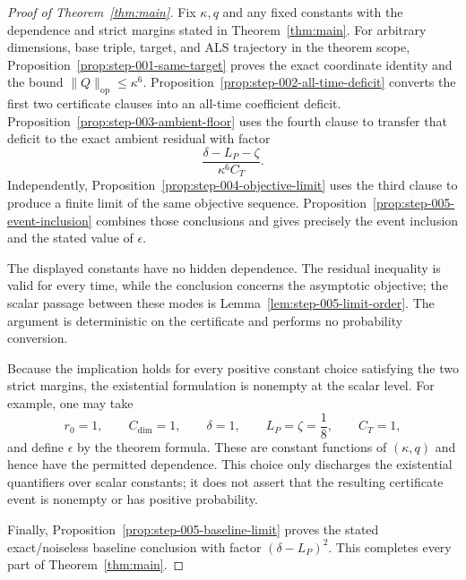 \begin{proof}[Proof of Theorem~\ref{thm:main}]
Fix $\kappa,q$ and any fixed constants with the dependence and
strict margins stated in Theorem~\ref{thm:main}.  For arbitrary dimensions,
base triple, target, and ALS trajectory in the theorem scope,
Proposition~\ref{prop:step-001-same-target} proves the exact coordinate
identity and the bound $\|Q\|_{\mathrm{op}}\leq\kappa^6$.
Proposition~\ref{prop:step-002-all-time-deficit} converts the first two
certificate clauses into an all-time coefficient deficit.
Proposition~\ref{prop:step-003-ambient-floor} uses the fourth clause to
transfer that deficit to the exact ambient residual with factor
\[
\frac{\delta-L_P-\zeta}{\kappa^6C_T}.
\]
Independently, Proposition~\ref{prop:step-004-objective-limit} uses the third
clause to produce a finite limit of the same objective sequence.
Proposition~\ref{prop:step-005-event-inclusion} combines those conclusions
and gives precisely the event inclusion and the stated value of $\epsilon$.

The displayed constants have no hidden dependence.  The residual inequality
is valid for every time, while the conclusion concerns the asymptotic
objective; the scalar passage between these modes is
Lemma~\ref{lem:step-005-limit-order}.  The argument is deterministic on the
certificate and performs no probability conversion.

Because the implication holds for every positive constant choice satisfying
the two strict margins, the existential formulation is nonempty at the scalar
level.  For example, one may take
\[
r_0=1,
\qquad C_{\mathrm{dim}}=1,
\qquad \delta=1,
\qquad L_P=\zeta=\frac18,
\qquad C_T=1,
\]
and define $\epsilon$ by the theorem formula.  These are constant functions
of $(\kappa,q)$ and hence have the permitted dependence.  This choice only
discharges the existential quantifiers over scalar constants; it does not
assert that the resulting certificate event is nonempty or has positive
probability.

Finally, Proposition~\ref{prop:step-005-baseline-limit} proves the stated
exact/noiseless baseline conclusion with factor $(\delta-L_P)^2$.  This
completes every part of Theorem~\ref{thm:main}.
\end{proof}

